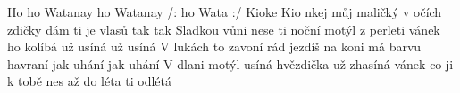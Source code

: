\begin{TEXT}{Ho ho Watanay}
\REFREN {} ho Watanay /:  ho Wata :/ 
Kioke Kio
\SLOKA {}nkej můj maličký  v očích zdičky
dám ti je  vlasů tak  tak 
\SLOKA Sladkou vůni nese ti noční motýl z perleti
vánek ho kolíbá už usíná už usíná
\SLOKA V lukách to zavoní rád jezdíš na koni
má barvu havraní jak uhání jak uhání
\SLOKA V dlani motýl usíná hvězdička už zhasíná
vánek co ji k tobě nes až do léta ti odlétá
\end{TEXT}